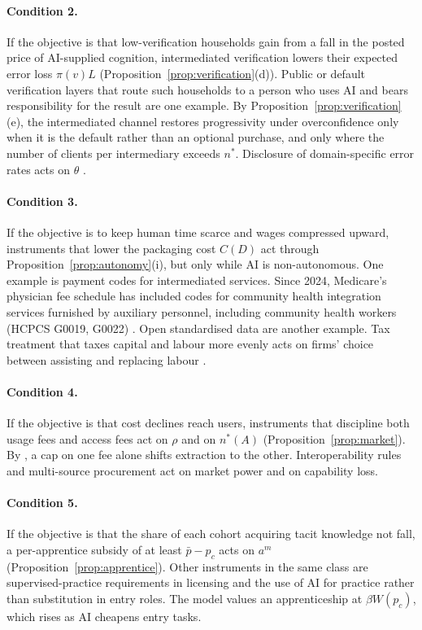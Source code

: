 \documentclass[12pt]{article}
\theoremstyle{remark}
\begin{document}
\paragraph{Condition 2.} If the objective is that low-verification households gain from a fall in the posted price of AI-supplied cognition, intermediated verification lowers their expected error loss $\pi(v)L$ (Proposition~\ref{prop:verification}(d)). Public or default verification layers that route such households to a person who uses AI and bears responsibility for the result are one example. By Proposition~\ref{prop:verification}(e), the intermediated channel restores progressivity under overconfidence only when it is the default rather than an optional purchase, and only where the number of clients per intermediary exceeds $n^*$. Disclosure of domain-specific error rates acts on $\theta$ \citep{steyvers2025know}.

\paragraph{Condition 3.} If the objective is to keep human time scarce and wages compressed upward, instruments that lower the packaging cost $C(D)$ act through Proposition~\ref{prop:autonomy}(i), but only while AI is non-autonomous. One example is payment codes for intermediated services. Since 2024, Medicare's physician fee schedule has included codes for community health integration services furnished by auxiliary personnel, including community health workers (HCPCS G0019, G0022) \citep{cms2023pfs}. Open standardised data are another example. Tax treatment that taxes capital and labour more evenly acts on firms' choice between assisting and replacing labour \citep{acemoglu2020tax}.

\paragraph{Condition 4.} If the objective is that cost declines reach users, instruments that discipline both usage fees and access fees act on $\rho$ and on $n^*(A)$ (Proposition~\ref{prop:market}). By \citet[p.~110]{athey2026competition}, a cap on one fee alone shifts extraction to the other. Interoperability rules and multi-source procurement act on market power and on capability loss.

\paragraph{Condition 5.} If the objective is that the share of each cohort acquiring tacit knowledge not fall, a per-apprentice subsidy of at least $\bar p-p_c$ acts on $a^m$ (Proposition~\ref{prop:apprentice}). Other instruments in the same class are supervised-practice requirements in licensing and the use of AI for practice rather than substitution in entry roles. The model values an apprenticeship at $\beta W(p_c)$, which rises as AI cheapens entry tasks.
\end{document}
